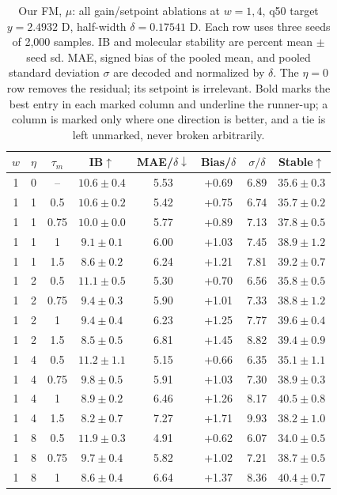 \documentclass{article}
\begin{document}
\clearpage
\begin{table}[!htbp]
\centering\small
\caption{Our FM, $\mu$: all gain/setpoint ablations at $w=1,4$, q50 target $y=2.4932$ D, half-width $\delta=0.17541$ D. Each row uses three seeds of 2,000 samples. IB and molecular stability are percent mean $\pm$ seed sd. MAE, signed bias of the pooled mean, and pooled standard deviation $\sigma$ are decoded and normalized by $\delta$. The $\eta=0$ row removes the residual; its setpoint is irrelevant. Bold marks the best entry in each marked column and underline the runner-up; a column is marked only where one direction is better, and a tie is left unmarked, never broken arbitrarily.}
\label{tab:grid-fm-mu}
\begin{tabular}{cccccccc}
\toprule
$w$ & $\eta$ & $\tau_m$ & IB$\uparrow$ & MAE/$\delta\downarrow$ & Bias/$\delta$ & $\sigma/\delta$ & Stable$\uparrow$\\
\midrule
1 & 0 & -- & $10.6\pm0.4$ & 5.53 & +0.69 & 6.89 & $35.6\pm0.3$\\
1 & 1 & 0.5 & $10.6\pm0.2$ & 5.42 & +0.75 & 6.74 & $35.7\pm0.2$\\
1 & 1 & 0.75 & $10.0\pm0.0$ & 5.77 & +0.89 & 7.13 & $37.8\pm0.5$\\
1 & 1 & 1 & $9.1\pm0.1$ & 6.00 & +1.03 & 7.45 & $38.9\pm1.2$\\
1 & 1 & 1.5 & $8.6\pm0.2$ & 6.24 & +1.21 & 7.81 & $39.2\pm0.7$\\
1 & 2 & 0.5 & $11.1\pm0.5$ & 5.30 & +0.70 & 6.56 & $35.8\pm0.5$\\
1 & 2 & 0.75 & $9.4\pm0.3$ & 5.90 & +1.01 & 7.33 & $38.8\pm1.2$\\
1 & 2 & 1 & $9.4\pm0.4$ & 6.23 & +1.25 & 7.77 & $39.6\pm0.4$\\
1 & 2 & 1.5 & $8.5\pm0.5$ & 6.81 & +1.45 & 8.82 & $39.4\pm0.9$\\
1 & 4 & 0.5 & $11.2\pm1.1$ & 5.15 & +0.66 & 6.35 & $35.1\pm1.1$\\
1 & 4 & 0.75 & $9.8\pm0.5$ & 5.91 & +1.03 & 7.30 & $38.9\pm0.3$\\
1 & 4 & 1 & $8.9\pm0.2$ & 6.46 & +1.26 & 8.17 & $\mathbf{40.5\pm0.8}$\\
1 & 4 & 1.5 & $8.2\pm0.7$ & 7.27 & +1.71 & 9.93 & $38.2\pm1.0$\\
1 & 8 & 0.5 & $11.9\pm0.3$ & 4.91 & +0.62 & 6.07 & $34.0\pm0.5$\\
1 & 8 & 0.75 & $9.7\pm0.4$ & 5.82 & +1.02 & 7.21 & $38.7\pm0.5$\\
1 & 8 & 1 & $8.6\pm0.4$ & 6.64 & +1.37 & 8.36 & $\underline{40.4\pm0.7}$\\

\end{tabular}
\end{table}
\end{document}
